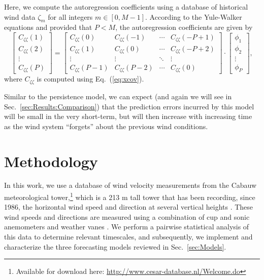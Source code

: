\documentclass[11pt, oneside]{article}
\newcommand{\eqnref}[1]{Eq.~(\ref{#1})}
\newcommand{\secref}[1]{Sec.~\ref{#1}}
\begin{document}
Here, we compute the autoregression coefficients using a database of historical wind data $\zeta_m$ for all integers $m \in [0, M-1]$.
According to the Yule-Walker equations and provided that $P < M$, the autoregression coefficients are given by \citep[Sec.~3.1.1]{Chatfield2000}
\begin{equation}
\begin{bmatrix}
C_{\zeta \zeta}(1) \\
C_{\zeta \zeta}(2) \\
\vdots \\
C_{\zeta \zeta}(P)
\end{bmatrix}
=
\begin{bmatrix}
C_{\zeta \zeta}(0) & C_{\zeta \zeta}(-1) & \cdots & C_{\zeta \zeta} (-P+1) \\
C_{\zeta \zeta}(1) & C_{\zeta \zeta}(0) & \cdots & C_{\zeta \zeta} (-P+2) \\
\vdots & \vdots & \ddots & \vdots \\
C_{\zeta \zeta}(P-1) & C_{\zeta \zeta}(P-2) & \cdots & C_{\zeta \zeta}(0)
\end{bmatrix}
\cdot
\begin{bmatrix}
\phi_1 \\
\phi_2 \\
\vdots \\
\phi_P
\end{bmatrix},
\end{equation}
where $C_{\zeta \zeta}$ is computed using \eqnref{eq:xcov}.

Similar to the persistence model, we can expect (and again we will see in \secref{sec:Results:Comparison}) that the prediction errors incurred by this model will be small in the very short-term, but will then increase with increasing time as the wind system ``forgets'' about the previous wind conditions.

\section{Methodology}\label{sec:Methodology}
In this work, we use a database of wind velocity measurements from the Cabauw meteorological tower,\footnote{Available for download here: \url{http://www.cesar-database.nl/Welcome.do}} which is a 213 m tall tower that has been recording, since 1986, the horizontal wind speed and direction at several vertical heights \citep[Table I]{VanUldenWieringa1996}. 
These wind speeds and directions are measured using a combination of cup and sonic anemometers and weather vanes \citep[Sec.~2.1]{Petrovic2018}.
We perform a pairwise statistical analysis of this data to determine relevant timescales, and
subsequently, we implement and characterize the three forecasting models reviewed in \secref{sec:Models}.
\end{document}
